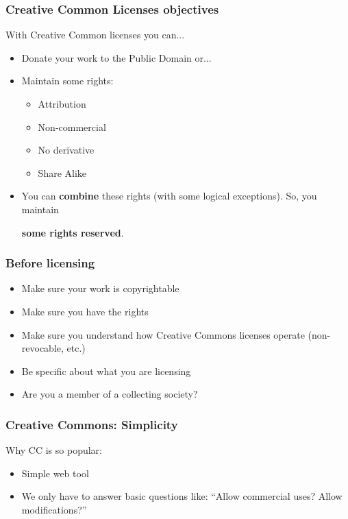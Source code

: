 
\begin{frame}
\frametitle{Creative Common Licenses objectives}

With Creative Common licenses you can...

\begin{itemize}
\item Donate your work to the Public Domain or...
\item Maintain some rights:
\begin{itemize}
\item Attribution
\item Non-commercial
\item No derivative
\item Share Alike
\end{itemize}
\item You can {\bf combine} these rights (with some logical exceptions). So, you maintain
\begin{center}
{\LARGE{\bf some rights reserved}}.
\end{center}
\end{itemize}

\end{frame}


\begin{frame}
\frametitle{Before licensing}


\begin{itemize}
\item Make sure your work is copyrightable
\item Make sure you have the rights
\item Make sure you understand how Creative Commons licenses operate (non-revocable, etc.)
\item Be specific about what you are licensing
\item Are you a member of a collecting society? 
\end{itemize}

\end{frame}



\begin{frame}
\frametitle{Creative Commons: Simplicity}

Why CC is so popular:

\begin{itemize}
\item Simple web tool
\item We only have to answer basic questions like: ``Allow commercial uses? Allow modifications?''
\end{itemize}

\end{frame}


